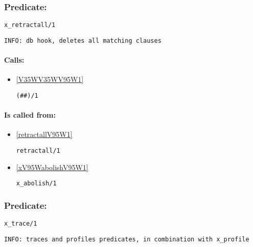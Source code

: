 \subsubsection{Predicate:} \label{xV95WretractallV95W1}

\begin{verbatim}
x_retractall/1
\end{verbatim}

{\small \begin{verbatim}
INFO: db hook, deletes all matching clauses

\end{verbatim}}
\paragraph{Calls:} 
\begin{itemize}
\item \ref{V35WV35WV95W1} 
\begin{verbatim}
(##)/1
\end{verbatim}

\end{itemize}
\paragraph{Is called from:} 
\begin{itemize}
\item \ref{retractallV95W1} 
\begin{verbatim}
retractall/1
\end{verbatim}

\item \ref{xV95WabolishV95W1} 
\begin{verbatim}
x_abolish/1
\end{verbatim}

\end{itemize}

\subsubsection{Predicate:} \label{xV95WtraceV95W1}

\begin{verbatim}
x_trace/1
\end{verbatim}

{\small \begin{verbatim}
INFO: traces and profiles predicates, in combination with x_profile

\end{verbatim}}
